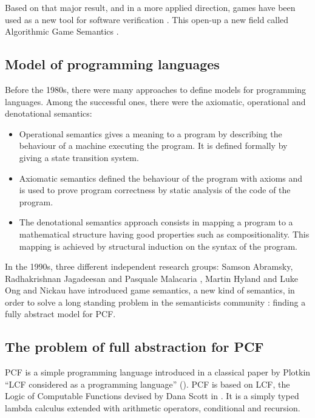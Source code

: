 Based on that major result, and in a more applied direction, games
have been used as a new tool for software verification
\cite{ghicamccusker00}. This open-up a new field called Algorithmic
Game Semantics \citep{Abr02}.




\subsection{Model of programming languages}

Before the 1980s, there were many approaches to define models for
programming languages. Among the successful ones, there were the
axiomatic, operational and denotational semantics:
\begin{itemize}
\item Operational semantics gives a meaning to a program by describing the
behaviour of a machine executing the program. It is defined formally
by giving a state transition system.
\item Axiomatic semantics defined the behaviour of the program
with axioms and is used to prove program correctness by static
analysis of the code of the program.
\item The denotational semantics approach consists in mapping a program to a mathematical structure
having good properties such as compositionality. This mapping is
achieved by structural induction on the syntax of the program.
\end{itemize}

In the 1990s, three different independent research groups: Samson
Abramsky, Radhakrishnan Jagadeesan and Pasquale Malacaria
\citep{abramsky94full}, Martin Hyland and Luke Ong
\citep{hylandong_pcf} and Nickau \citep{Nickau:lfcs94} have
introduced game semantics, a new kind of semantics, in order to
solve a long standing problem in the semanticists community :
finding a fully abstract model for PCF.

\subsection{The problem of full abstraction for PCF}

PCF is a simple programming language introduced in a classical paper
by Plotkin ``LCF considered as a programming language''
(\cite{DBLP:journals/tcs/Plotkin77}). PCF is based on LCF, the Logic
of Computable Functions devised by Dana Scott in \cite{scott_lcf}.
It is a simply typed lambda calculus extended with arithmetic
operators, conditional and recursion.

